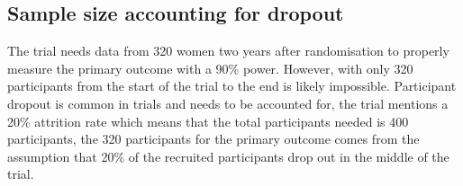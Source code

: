 \documentclass{article}
\begin{document}
\subsection{Sample size accounting for dropout}
The trial needs data from 320 women two years after randomisation to properly measure the primary outcome with a 90\% power. However, with only 320 participants from the start of the trial to the end is likely impossible. Participant dropout is common in trials and needs to be accounted for, the trial mentions a 20\% attrition rate which means that the total participants needed is 400 participants, the 320 participants for the primary outcome comes from the assumption that 20\% of the recruited participants drop out in the middle of the trial.

\printbibliography
\end{document}
